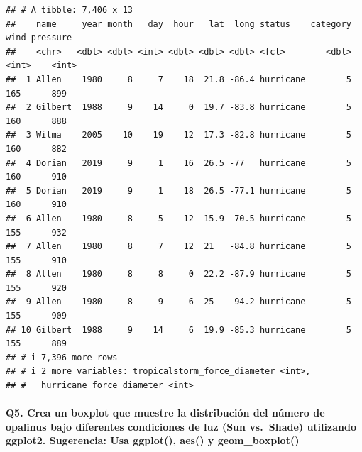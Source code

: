 \documentclass[
]{article}
\begin{document}
\begin{verbatim}
## # A tibble: 7,406 x 13
##    name     year month   day  hour   lat  long status    category  wind pressure
##    <chr>   <dbl> <dbl> <int> <dbl> <dbl> <dbl> <fct>        <dbl> <int>    <int>
##  1 Allen    1980     8     7    18  21.8 -86.4 hurricane        5   165      899
##  2 Gilbert  1988     9    14     0  19.7 -83.8 hurricane        5   160      888
##  3 Wilma    2005    10    19    12  17.3 -82.8 hurricane        5   160      882
##  4 Dorian   2019     9     1    16  26.5 -77   hurricane        5   160      910
##  5 Dorian   2019     9     1    18  26.5 -77.1 hurricane        5   160      910
##  6 Allen    1980     8     5    12  15.9 -70.5 hurricane        5   155      932
##  7 Allen    1980     8     7    12  21   -84.8 hurricane        5   155      910
##  8 Allen    1980     8     8     0  22.2 -87.9 hurricane        5   155      920
##  9 Allen    1980     8     9     6  25   -94.2 hurricane        5   155      909
## 10 Gilbert  1988     9    14     6  19.9 -85.3 hurricane        5   155      889
## # i 7,396 more rows
## # i 2 more variables: tropicalstorm_force_diameter <int>,
## #   hurricane_force_diameter <int>
\end{verbatim}

\paragraph{Q5. Crea un boxplot que muestre la distribución del número de
opalinus bajo diferentes condiciones de luz (Sun vs.~Shade) utilizando
ggplot2. Sugerencia: Usa ggplot(), aes() y
geom\_boxplot()}\label{q5.-crea-un-boxplot-que-muestre-la-distribuciuxf3n-del-nuxfamero-de-opalinus-bajo-diferentes-condiciones-de-luz-sun-vs.-shade-utilizando-ggplot2.-sugerencia-usa-ggplot-aes-y-geom_boxplot}
\end{document}
